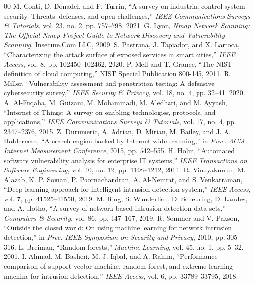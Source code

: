 \documentclass[conference]{IEEEtran}
\begin{document}
\begin{thebibliography}{00}
 M. Conti, D. Donadel, and F. Turrin, ``A survey on industrial control system security: Threats, defenses, and open challenges,'' \textit{IEEE Communications Surveys \& Tutorials}, vol. 23, no. 2, pp. 757--798, 2021.
 G. Lyon, \textit{Nmap Network Scanning: The Official Nmap Project Guide to Network Discovery and Vulnerability Scanning}. Insecure.Com LLC, 2009.
 S. Pastrana, J. Tapiador, and X. Larroca, ``Characterizing the attack surface of exposed services in smart cities,'' \textit{IEEE Access}, vol. 8, pp. 102450--102462, 2020.
 P. Mell and T. Grance, ``The NIST definition of cloud computing,'' NIST Special Publication 800-145, 2011.
 B. Miller, ``Vulnerability assessment and penetration testing: A defensive cybersecurity survey,'' \textit{IEEE Security \& Privacy}, vol. 18, no. 4, pp. 32--41, 2020.
 A. Al-Fuqaha, M. Guizani, M. Mohammadi, M. Aledhari, and M. Ayyash, ``Internet of Things: A survey on enabling technologies, protocols, and applications,'' \textit{IEEE Communications Surveys \& Tutorials}, vol. 17, no. 4, pp. 2347--2376, 2015.
 Z. Durumeric, A. Adrian, D. Mirian, M. Bailey, and J. A. Halderman, ``A search engine backed by Internet-wide scanning,'' in \textit{Proc. ACM Internet Measurement Conference}, 2015, pp. 542--555.
 H. Holm, ``Automated software vulnerability analysis for enterprise IT systems,'' \textit{IEEE Transactions on Software Engineering}, vol. 40, no. 12, pp. 1198--1212, 2014.
 R. Vinayakumar, M. Alazab, K. P. Soman, P. Poornachandran, A. Al-Nemrat, and S. Venkatraman, ``Deep learning approach for intelligent intrusion detection system,'' \textit{IEEE Access}, vol. 7, pp. 41525--41550, 2019.
 M. Ring, S. Wunderlich, D. Scheuring, D. Landes, and A. Hotho, ``A survey of network-based intrusion detection data sets,'' \textit{Computers \& Security}, vol. 86, pp. 147--167, 2019.
 R. Sommer and V. Paxson, ``Outside the closed world: On using machine learning for network intrusion detection,'' in \textit{Proc. IEEE Symposium on Security and Privacy}, 2010, pp. 305--316.
 L. Breiman, ``Random forests,'' \textit{Machine Learning}, vol. 45, no. 1, pp. 5--32, 2001.
 I. Ahmad, M. Basheri, M. J. Iqbal, and A. Rahim, ``Performance comparison of support vector machine, random forest, and extreme learning machine for intrusion detection,'' \textit{IEEE Access}, vol. 6, pp. 33789--33795, 2018.

\end{thebibliography}
\end{document}
